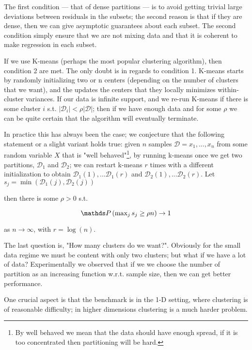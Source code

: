 The first condition ---  that of dense partitions ---  is to avoid getting trivial large deviations between residuals 
in the subsets; the second reason is that if they are dense, then we can give asymptotic guarantees about each subset.
The second condition simply ensure that we are not mixing data and that it is coherent to make regression
in each subset. 

If we use K-means (perhaps the most popular clustering algorithm), then condition 2 are met. The only 
doubt is in regards to condition 1. K-means starts by randomly initializing two or n centers (depending 
on the number of clusters that we want), and the updates the centers that they locally 
minimizes within-cluster variances. If our data is infinite support, and we re-run K-means if there is some cluster
$i$ s.t. $|\mathcal{D}_i| < \rho |\mathcal{D}|$; then if we have enough data and for some $\rho$ we can be quite 
certain that the algorithm will eventually terminate. 

In practice this has always been the case; we conjecture that the following statement or a slight variant holds true: 
given $n$ samples $ \mathcal{D} = x_1, ..., x_n$ from some random variable $X$ 
that is "well behaved"\footnote{By well behaved we mean that the data should have enough spread, if it is too
concentrated then partitioning will be hard.}, by running k-means once we get two partitions, 
$\mathcal{D}_1$ and $\mathcal{D}_2$; we can
restart k-means $r$  times with a different initialization to obtain $\mathcal{D}_1(1), ...\mathcal{D}_1(r)$ and 
$\mathcal{D}_2(1), ...\mathcal{D}_2(r)$. Let $s_j = \operatorname{min} \left(\mathcal{D}_1(j), \mathcal{D}_2(j)\right)$

then there is some $\rho > 0$ s.t.

$$
    \Prob \left( \operatorname{max}_j s_j \geq \rho n \right) \rightarrow 1
$$

as $n \rightarrow \infty$, with $r = \log(n)$. 

The last question is, "How many clusters do we want?". Obviously for the small data regime we must be content 
with only two clusters; but what if we have a lot of data? Experimentally we observed that if we 
we choose the number of partition as an increasing function w.r.t. sample size, then we can get better performance.

One crucial aspect is that the benchmark is in the 1-D setting, where clustering is of reasonable difficulty; 
in higher dimensions clustering is a much harder problem. 


